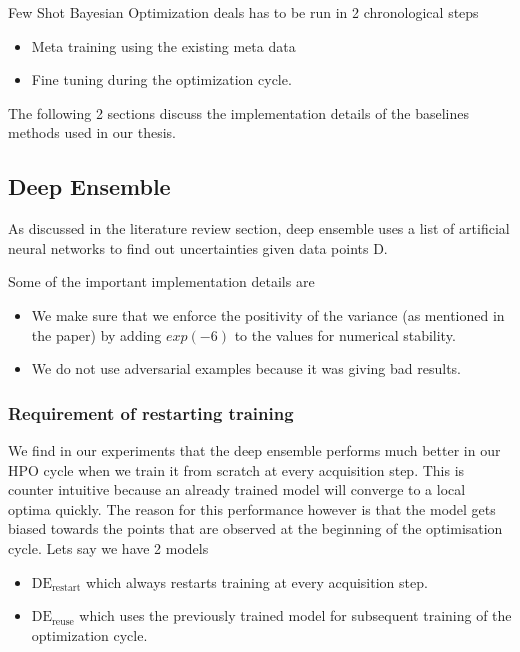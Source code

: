 \documentclass[11pt]{report}
\begin{document}
Few Shot Bayesian Optimization deals has to be run in 2 chronological steps
\begin{itemize}
\item Meta training using the existing meta data
\item Fine tuning during the optimization cycle.
\end{itemize}


The following 2 sections discuss the implementation details of the baselines methods used in our thesis.

\subsection{Deep Ensemble}
As discussed in the literature review section,  deep ensemble uses a list of artificial neural networks to find out uncertainties given data points D.

Some of the important implementation details are
\begin{itemize}
\item We make sure that we enforce the positivity of the variance (as mentioned in the paper) by adding $exp(-6)$ to the values for numerical stability.
\item We do not use adversarial examples because it was giving bad results.
\end{itemize}
    
\subsubsection{Requirement of restarting training}\label{sec:restart}
We find in our experiments that the deep ensemble performs much better in our HPO cycle when we train it from scratch at every acquisition step.
This is counter intuitive because an already trained model will converge to a local optima quickly.
The reason for this performance however is that the model gets biased towards the points that are observed at the beginning of the optimisation cycle.
Lets say we have 2 models 
\begin{itemize}
\item $\textrm{DE}_{\textrm{restart}}$ which always restarts training at every acquisition step.
\item $\textrm{DE}_{\textrm{reuse}}$ which uses the previously trained model for subsequent training of the optimization cycle.
\end{itemize}
\end{document}
